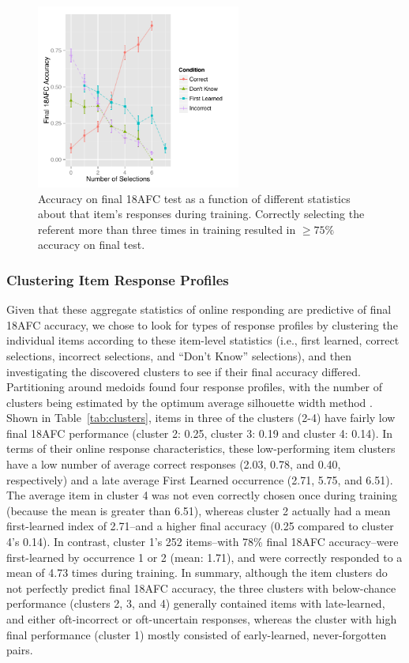 \documentclass[man,floatsintext]{apa6}
\begin{document}
\begin{figure}[h]
  \centering
  \includegraphics[width=0.6\textwidth]{responses_vs_final_acc}
  \caption{Accuracy on final 18AFC test as a function of different statistics about that item's responses during training. Correctly selecting the referent more than three times in training resulted in $\geq75\%$ accuracy on final test.}
  \label{fig:test_acc}
\end{figure} 

\subsubsection{Clustering Item Response Profiles}

Given that these aggregate statistics of online responding are predictive of final 18AFC accuracy, we chose to look for types of response profiles by clustering the individual items according to these item-level statistics (i.e., first learned, correct selections, incorrect selections, and ``Don't Know'' selections), and then investigating the discovered clusters to see if their final accuracy differed. Partitioning around medoids \citep{fpc} found four response profiles, with the number of clusters being estimated by the optimum average silhouette width method \citep{silhouette}. Shown in Table~\ref{tab:clusters}, items in three of the clusters (2-4) have fairly low final 18AFC performance (cluster 2: 0.25, cluster 3: 0.19 and cluster 4: 0.14). In terms of their online response characteristics, these low-performing item clusters have a low number of average correct responses (2.03, 0.78, and 0.40, respectively) and a late average First Learned occurrence (2.71, 5.75, and 6.51). The average item in cluster 4 was not even correctly chosen once during training (because the mean is greater than 6.51), whereas cluster 2 actually had a mean first-learned index of 2.71--and a higher final accuracy (0.25 compared to cluster 4's 0.14). In contrast, cluster 1's 252 items--with 78\% final 18AFC accuracy--were first-learned by occurrence 1 or 2 (mean: 1.71), and were correctly responded to a mean of 4.73 times during training. In summary, although the item clusters do not perfectly predict final 18AFC accuracy, the three clusters with below-chance performance (clusters 2, 3, and 4) generally contained items with late-learned, and either oft-incorrect or oft-uncertain responses, whereas the cluster with high final performance (cluster 1) mostly consisted of early-learned, never-forgotten pairs. 
\end{document}
